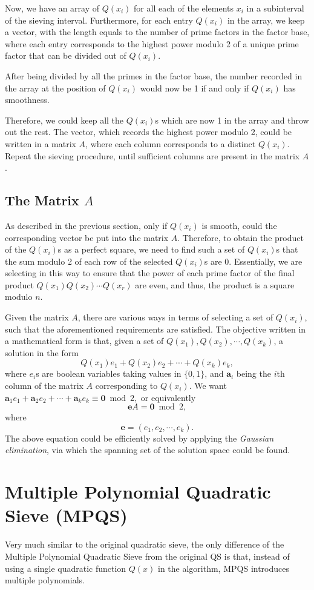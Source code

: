 \documentclass[letterpaper, 10pt, conference]{ieeeconf}  %
\theoremstyle{definition}
\theoremstyle{property}
\begin{document}
Now, we have an array of $Q(x_i)$ for all each of the elements $x_i$ in a subinterval of the sieving interval. Furthermore, for each entry $Q(x_i)$ in the array, we keep a vector, with the length equals to the number of prime factors in the factor base, where each entry corresponds to the highest power modulo 2 of a unique prime factor that can be divided out of $Q(x_i)$.

After being divided by all the primes in the factor base, the number recorded in the array at the position of $Q(x_i)$ would now be 1 if and only if $Q(x_i)$ has smoothness. 

Therefore, we could keep all the $Q(x_i)$s which are now 1 in the array and throw out the rest. The vector, which records the highest power modulo 2, could be written in a matrix $A$, where each column corresponds to a distinct $Q(x_i)$. Repeat the sieving procedure, until sufficient columns are present in the matrix $A$. 

\subsection{The Matrix $A$}
As described in the previous section, only if $Q(x_i)$ is smooth, could the corresponding vector be put into the matrix $A$. Therefore, to obtain the product of the $Q(x_i)$s as a perfect square, we need to find such a set of $Q(x_i)$s that the sum modulo 2 of each row of the selected $Q(x_i)$s are 0. Essentially, we are selecting in this way to ensure that the power of each prime factor of the final product $Q(x_1)Q(x_2)\cdots Q(x_r)$ are even, and thus, the product is a square modulo $n$.

Given the matrix $A$, there are various ways in terms of selecting a set of $Q(x_i)$, such that the aforementioned requirements are satisfied. The objective written in a mathematical form is that, given a set of $Q(x_1), Q(x_2), \cdots, Q(x_k)$, a solution in the form
$$Q(x_1)e_1+Q(x_2)e_2+\cdots +Q(x_k)e_k,$$
where $e_i$s are boolean variables taking values in $\{0,1\}$, and $\mathbf{a}_i$ being the $i$th column of the matrix $A$ corresponding to $Q(x_i)$. We want
$\mathbf{a}_1e_1+\mathbf{a}_2e_2+\cdots +\mathbf{a}_ke_k \equiv \mathbf{0}\bmod 2,$
or equivalently 
$$\mathbf{e}A = \mathbf{0}\bmod 2,$$
where 
$$\mathbf{e} = (e_1,e_2,\cdots,e_k).$$
The above equation could be efficiently solved by applying the \textit{Gaussian elimination}, via which the spanning set of the solution space could be found.

\section{Multiple Polynomial Quadratic Sieve (MPQS)}
Very much similar to the original quadratic sieve, the only difference of the Multiple Polynomial Quadratic Sieve from the original QS is that, instead of using a single quadratic function $Q(x)$ in the algorithm, MPQS introduces multiple polynomials.
\end{document}
